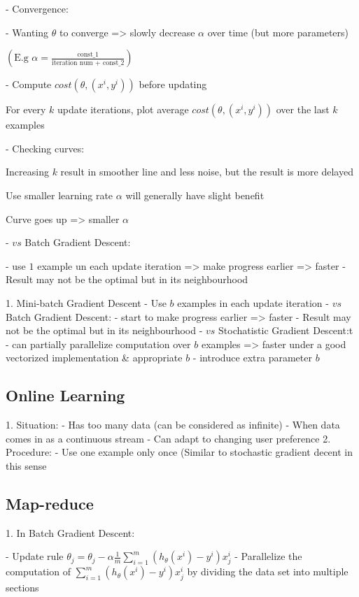 - Convergence:

- Wanting $\theta$ to converge => slowly decrease $\alpha$ over time (but more parameters)

\( ( \displaystyle \text{E.g } \alpha = \frac {\text{const\_1}} {\text{iteration num + const\_2}} ) \)

- Compute $cost(\theta,(x^i,y^i))$ before updating 

For every $k$ update iterations, plot average $cost(\theta,(x^i,y^i))$ over the last $k$ examples

- Checking curves:

Increasing $k$ result in smoother line and less noise, but the result is more delayed

Use smaller learning rate $\alpha$ will generally have slight benefit

Curve goes up => smaller $\alpha$ 

- $vs$ Batch Gradient Descent:

- use $1$ example un each update iteration => make progress earlier => faster
- Result may not be the optimal but in its neighbourhood

1. Mini-batch Gradient Descent
- Use $b$ examples in each update iteration
- $vs$  Batch Gradient Descent:
- start to make progress earlier => faster
- Result may not be the optimal but in its neighbourhood
- $vs$ Stochatistic Gradient Descent:t
- can partially parallelize computation over $b$ examples => faster under a good vectorized implementation \& appropriate $b$ 
- introduce extra parameter $b$ 

\subsection{Online Learning}

1. Situation:
- Has too many data (can be considered as infinite)
- When data comes in as a continuous stream
- Can adapt to changing user preference
2. Procedure:
- Use one example only once (Similar to stochastic gradient decent in this sense

\subsection{Map-reduce}

1. In Batch Gradient Descent:

- Update rule $\displaystyle \theta_j = \theta_j - \alpha \frac 1 m \sum^m_{i=1} (h_\theta(x^i)-y^i)x_j^i$ 
- Parallelize the computation of $\displaystyle \sum^m_{i=1} (h_\theta(x^i)-y^i)x_j^i$ by dividing the data set into multiple sections

